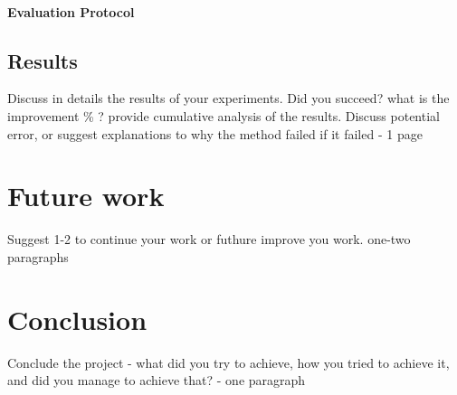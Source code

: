 \documentclass{acmart}
\begin{document}
\paragraph{Evaluation Protocol}

 \subsection{Results}
 Discuss in details the results of your experiments. Did you succeed? what is the improvement \% ? provide cumulative analysis of the results. Discuss potential error, or suggest explanations to why the method failed if it failed - 
 1 page


\section{Future work}
Suggest 1-2 to continue your work or futhure improve you work.
one-two paragraphs

\section{Conclusion}
Conclude the project - what did you try to achieve, how you tried to achieve it, and did you manage to achieve that?  - one paragraph



\end{document}

